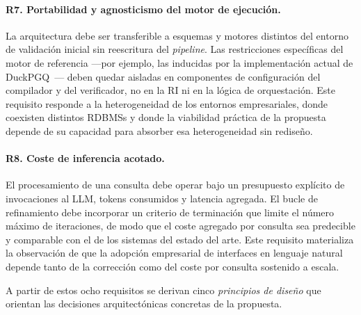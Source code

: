 \paragraph{R7. Portabilidad y agnosticismo del motor de ejecución.} La
arquitectura debe ser transferible a esquemas y motores distintos del entorno
de validación inicial sin reescritura del \emph{pipeline}. Las restricciones
específicas del motor de referencia ---por ejemplo, las inducidas por la
implementación actual de DuckPGQ~\cite{DuckPGQ}--- deben quedar
aisladas en componentes de configuración del compilador y del verificador, no
en la \ac{RI} ni en la lógica de orquestación. Este requisito responde a la
heterogeneidad de los entornos empresariales, donde coexisten distintos
\acp{RDBMS} y donde la viabilidad práctica de la propuesta depende de su
capacidad para absorber esa heterogeneidad sin rediseño.

\paragraph{R8. Coste de inferencia acotado.} El procesamiento de una consulta
debe operar bajo un presupuesto explícito de invocaciones al \ac{LLM}, tokens
consumidos y latencia agregada. El bucle de refinamiento debe incorporar un
criterio de terminación que limite el número máximo de iteraciones, de modo
que el coste agregado por consulta sea predecible y comparable con el de los
sistemas del estado del arte. Este requisito materializa la observación de %
que la adopción empresarial de interfaces en lenguaje natural depende tanto
de la corrección como del coste por consulta sostenido a escala.

A partir de estos ocho requisitos se derivan cinco \emph{principios de
diseño} que orientan las decisiones arquitectónicas concretas de la propuesta.


